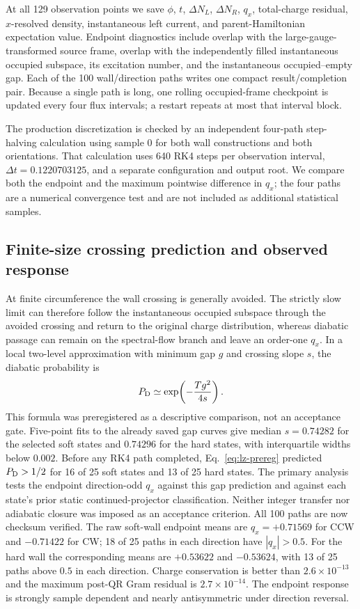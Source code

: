 \documentclass[aps,prb,twocolumn,floatfix,nofootinbib,superscriptaddress]{revtex4-2}
\begin{document}
At all 129 observation points we save $\phi$, $t$, $\Delta N_L$,
$\Delta N_R$, $q_x$, total-charge residual, $x$-resolved density, instantaneous
left current, and parent-Hamiltonian expectation value.  Endpoint diagnostics
include overlap with the large-gauge-transformed source frame, overlap with
the independently filled instantaneous occupied subspace, its excitation
number, and the instantaneous occupied--empty gap.  Each of the 100
wall/direction paths writes one compact result/completion pair.  Because a
single path is long, one rolling occupied-frame checkpoint is updated every
four flux intervals; a restart repeats at most that interval block.

The production discretization is checked by an independent four-path
step-halving calculation using sample 0 for both wall constructions and both
orientations.  That calculation uses 640 RK4 steps per observation interval,
$\Delta t=0.1220703125$, and a separate configuration and output root.  We
compare both the endpoint and the maximum pointwise difference in $q_x$; the
four paths are a numerical convergence test and are not included as additional
statistical samples.

\subsection{Finite-size crossing prediction and observed response}

At finite circumference the wall crossing is generally avoided.  The
strictly slow limit can therefore follow the instantaneous occupied subspace
through the avoided crossing and return to the original charge distribution,
whereas diabatic passage can remain on the spectral-flow branch and leave an
order-one $q_x$.  In a local two-level approximation with minimum gap $g$ and
crossing slope $s$, the diabatic probability is
\begin{equation}
 P_{\rm D}\simeq
 \exp\!\left(-\frac{Tg^2}{4s}\right).
 \label{eq:lz-prereg}
\end{equation}
This formula was preregistered as a descriptive comparison, not an acceptance
gate.  Five-point fits to the already saved gap curves give median
$s=0.74282$ for the selected soft states and $0.74296$ for the hard states,
with interquartile widths below $0.002$.  Before any RK4 path completed,
Eq.~\eqref{eq:lz-prereg} predicted $P_{\rm D}>1/2$ for 16 of 25 soft states
and 13 of 25 hard states.  The primary analysis tests the endpoint
direction-odd $q_x$ against this gap prediction and against each state's prior
static continued-projector classification.  Neither integer transfer nor
adiabatic closure was imposed as an acceptance criterion.  All 100 paths are
now checksum verified.  The raw soft-wall endpoint means are $q_x=+0.71569$
for CCW and $-0.71422$ for CW; 18 of 25 paths in each direction have
$|q_x|>0.5$.  For the hard wall the corresponding means are $+0.53622$ and
$-0.53624$, with 13 of 25 paths above $0.5$ in each direction.  Charge
conservation is better than $2.6\times10^{-13}$ and the maximum post-QR Gram
residual is $2.7\times10^{-14}$.  The endpoint response is strongly sample
dependent and nearly antisymmetric under direction reversal.
\end{document}
